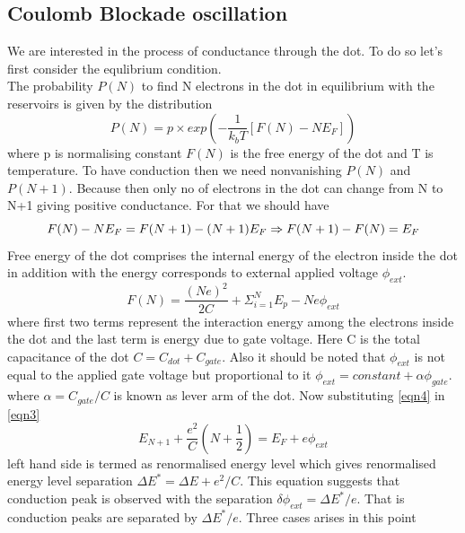 \documentclass[a4paper]{report}
\begin{document}
    \subsection*{Coulomb Blockade oscillation}
      \hspace{10pt} We are interested in the process of conductance through the dot. To do so let's first consider the equlibrium condition. \\
      The probability $P(N)$ to find N electrons in the dot in equilibrium with the reservoirs is given by the distribution 
      \begin{equation} \label{eqn2} 
        P(N) = p\times exp\left( -\frac{1}{k_{b}T} [F(N)-NE_{F}]\right)
      \end{equation}
      where p is normalising constant $F(N)$ is the free energy of the dot and T is temperature. To have conduction then we need nonvanishing $P(N)$ and $P(N+1)$. Because then only no of electrons in the dot can change from N to N+1 giving positive conductance. For that we should have 
      \begin{equation} \label{eqn3}
        F(N)-NE_{F}=F(N+1)-(N+1)E_{F} \\
        \Rightarrow F(N+1)-F(N)=E_{F}
      \end{equation}
      Free energy of the dot comprises  the internal energy of the electron inside the dot in addition with the energy corresponds to external applied voltage $\phi_{ext}$.
      \begin{equation}\label{eqn4} 
        F(N) = \dfrac{(Ne)^2}{2C} + \Sigma_{i=1} ^N E_{p} -Ne\phi_{ext}
      \end{equation}
      where first two terms represent the interaction energy among the electrons inside the dot and the last term is energy due to gate voltage. Here C is the total capacitance of the dot $C = C_{dot}+C_{gate}$. Also it should be noted that $\phi_{ext}$ is not equal to the applied gate voltage but proportional to it $\phi_{ext} = constant + \alpha \phi_{gate}$. where $\alpha = C_{gate}/C$ is known as lever arm of the dot. Now substituting \ref{eqn4} in \ref{eqn3} 
      \begin{equation} \label{eqn5}
        E_{N+1} + \dfrac{e^2}{C}\left(N+\frac{1}{2}\right) = E_{F} + e\phi_{ext}
      \end{equation}
      left hand side is termed as renormalised energy level which gives renormalised energy level separation $\Delta E^* = \Delta E + e^2/C$. This equation suggests that conduction peak is observed with the separation $\delta \phi_{ext} = \Delta E^*/e$. That is conduction peaks are separated by $\Delta E^*/e$. Three cases arises in this point
\end{document}
